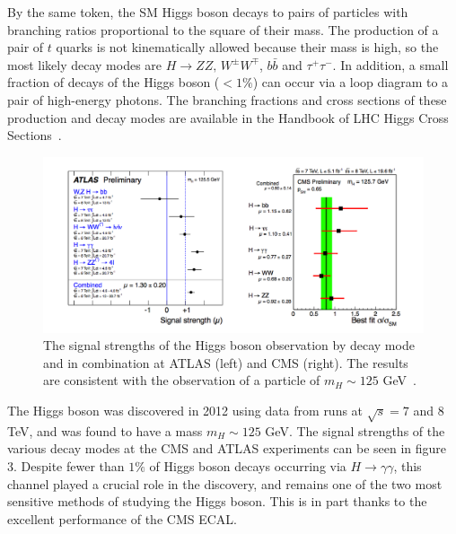 \documentclass[10pt]{article}
\begin{document}
By the same token, the SM Higgs boson decays to pairs of particles with branching ratios proportional to the square of their mass. The production of a pair of $t$ quarks is not kinematically allowed because their mass is high, so the most likely decay modes are $H \rightarrow ZZ \text{, } W^{\pm}W^{\mp}$, $ b\bar{b}$ and $ \tau^+ \tau^-$. In addition, a small fraction of decays of the Higgs boson ($<1\%$) can occur via a loop diagram to a pair of high-energy photons. The branching fractions and cross sections of these production and decay modes are available in the Handbook of LHC Higgs Cross Sections~\cite{H_XS1,H_XS2}.


\begin{figure}[h!]

  \centering
\includegraphics[width=\textwidth]{"SignalStrength"}
\caption{The signal strengths of the Higgs boson observation by decay mode and in combination at ATLAS (left) and CMS (right). The results are consistent with the observation of a particle of $m_H \sim 125$ GeV~\cite{H_XS3}.}
\end{figure}

The Higgs boson was discovered in 2012 using data from runs at $\sqrt{s}=7$ and $8$ TeV, and was found to have a mass $m_H \sim 125$ GeV. The signal strengths of the various decay modes at the CMS and ATLAS experiments can be seen in figure 3. Despite fewer than $1\%$ of Higgs boson decays occurring via $H \rightarrow \gamma \gamma$, this channel played a crucial role in the discovery, and remains one of the two most sensitive methods of studying the Higgs boson. This is in part thanks to the excellent performance of the CMS ECAL.
\end{document}
